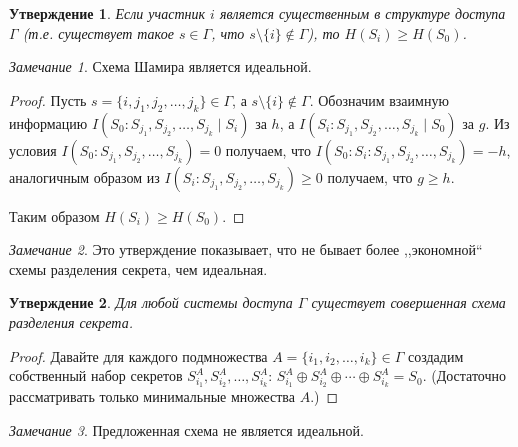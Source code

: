 \documentclass[12pt]{article}
\newcommand{\seqn}[2]{{#1}_1,{#1}_2,\dotsc,{#1}_{#2}}
\newcommand{\seqin}[3]{{#1}_{{#2}_1},{#1}_{{#2}_2},\dotsc,{#1}_{{#2}_{#3}}}
\theoremstyle{definition}
\theoremstyle{plain}
\newtheorem{statement}{Утверждение}[section]
\theoremstyle{remark}
\newtheorem{remark}{Замечание}[section]
\begin{document}
\begin{statement}
        Если участник $i$ является \emph{существенным} в структуре доступа $\Gamma$ (т.е. существует
        такое $s\in\Gamma$, что $s\setminus\{i\}\not\in\Gamma$), то $H(S_i)\ge H(S_0)$. 
\end{statement}
\begin{remark}
    Схема Шамира является идеальной.
\end{remark}
\begin{proof} Пусть $s=\{i,\seqn{j}{k}\}\in\Gamma$, а $s\setminus \{i\}\not\in\Gamma$. 
    Обозначим взаимную информацию  $I(S_0:\seqin{S}{j}{k}\mid S_i)$ за $h$, 
    а $I(S_i:\seqin{S}{j}{k}\mid S_0)$ за $g$. Из условия 
    $I(S_0:\seqin{S}{j}{k}) = 0$ получаем, что $I(S_0:S_i:\seqin{S}{j}{k}) = -h$, аналогичным
    образом из $I(S_i:\seqin{S}{j}{k})\ge 0$ получаем, что $g \ge h$.

    \begin{center}
    \end{center}
    Таким образом $H(S_i) \ge H(S_0)$.
\end{proof}
\begin{remark}
    Это утверждение показывает, что не бывает более ,,экономной`` схемы разделения секрета, чем идеальная.
\end{remark}


\begin{statement}
    Для любой системы доступа $\Gamma$ существует совершенная схема разделения секрета.
\end{statement}
\begin{proof}
    Давайте для каждого подмножества $A = \{\seqn{i}{k}\}\in\Gamma$ создадим собственный набор секретов
    $S^A_{i_1}, S^A_{i_2},\dotsc,S^A_{i_k}$: $S^A_{i_1}\oplus S^A_{i_2}\oplus\dotsb\oplus S^A_{i_k}
    = S_0$. 
   (Достаточно рассматривать только минимальные множества $A$.)
\end{proof}
\begin{remark}
    Предложенная схема не является идеальной.
\end{remark}
\end{document}
